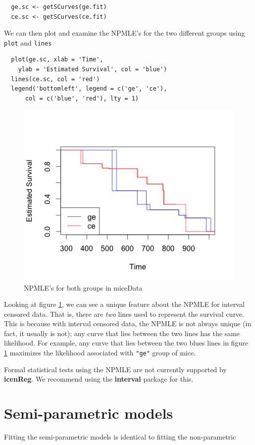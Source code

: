 \documentclass[11pt]{report}
\begin{document}
  \begin{verbatim}
  ge.sc <- getSCurves(ge.fit)
  ce.sc <- getSCurves(ce.fit)
  \end{verbatim}

  We can then plot and examine the NPMLE's for the two different groups
  using \texttt{plot} and \texttt{lines}
  
  \begin{verbatim}
  plot(ge.sc, xlab = 'Time', 
    ylab = 'Estimated Survival', col = 'blue')
  lines(ce.sc, col = 'red')
  legend('bottomleft', legend = c('ge', 'ce'), 
      col = c('blue', 'red'), lty = 1)
  \end{verbatim}

  \begin{figure}
  \centerline{\includegraphics{MICE_NPMLES.png}}
  \caption[MICE NPMLE]{NPMLE's for both groups in miceData} 
  \label{figure:MICE}
  \end{figure}

  Looking at figure \ref{figure:MICE}, we can see a unique feature about the NPMLE for 
  interval censored data. That is, there are \emph{two} lines used to represent
  the survival curve. This is because with interval censored data, the NPMLE
  is not always unique (in fact, it usually is not); any curve that lies between
  the two lines has the same likelihood. For example, any curve that lies between
  the two blues lines in figure \ref{figure:MICE} maximizes the likelihood 
  associated with \texttt{"ge"} group of mice. 

  Formal statistical tests using the NPMLE are not currently supported by 
{\bf icenReg}. We recommend using the {\bf interval} package for this. 

  \section{Semi-parametric models}

  Fitting the semi-parametric models is identical to fitting the non-parametric
\end{document}
